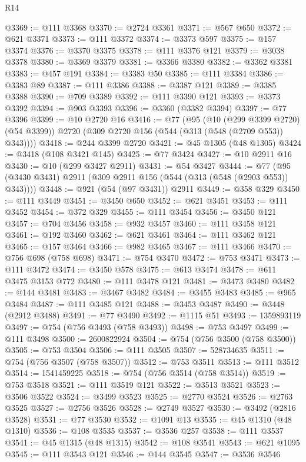 \begin{lexlean}{R14}
\begin{coremodule}
@3369 := @111 @3368
@3370 := @2724 @3361
@3371 := @567 @650
@3372 := @621 @3371
@3373 := @111 @3372
@3374 := @3373 @597
@3375 := @157 @3374
@3376 := @3370 @3375
@3378 := @111 @3376 @121
@3379 := @3038 @3378
@3380 := @3369 @3379
@3381 := @3366 @3380
@3382 := @3362 @3381
@3383 := @457 @191
@3384 := @3383 @50
@3385 := @111 @3384
@3386 := @3383 @89
@3387 := @111 @3386
@3388 := @3387 @121
@3389 := @3385 @3388
@3390 := @709 @3389
@3392 := @111 @3390 @121
@3393 := @3373 @3392
@3394 := @903 @3393
@3396 := @3360 (@3382 @3394)
@3397 := @77 @3396
@3399 := @10 @2720 @16
@3416 := @77
    (@95
      (@10 (@299 @3399 @2720) (@54 @3399))
      @2720
      (@309 @2720 @156 (@544 (@313 (@548 (@2709 @553)) @343))))
@3418 := @244 @3399 @2720
@3421 := @45 @1305 (@48 @1305)
@3424 := @3418 (@108 @3421 @145)
@3425 := @77 @3424
@3427 := @10 @2911 @16
@3430 := @10 (@299 @3427 @2911)
@3431 := @54 @3427
@3444 := @77 (@95 (@3430 @3431) @2911 (@309 @2911 @156 (@544 (@313 (@548 (@2903 @553)) @343))))
@3448 := @921 (@54 (@97 @3431)) @2911
@3449 := @358 @329
@3450 := @111 @3449
@3451 := @3450 @650
@3452 := @621 @3451
@3453 := @111 @3452
@3454 := @372 @329
@3455 := @111 @3454
@3456 := @3450 @121
@3457 := @704 @3456
@3458 := @932 @3457
@3460 := @111 @3458 @121
@3461 := @192 @3460
@3462 := @621 @3461
@3464 := @111 @3462 @121
@3465 := @157 @3464
@3466 := @982 @3465
@3467 := @111 @3466
@3470 := @756 @698 (@758 @698)
@3471 := @754 @3470
@3472 := @753 @3471
@3473 := @111 @3472
@3474 := @3450 @578
@3475 := @613 @3474
@3478 := @611 @3475 @3153 @772
@3480 := @111 @3478 @121
@3481 := @3473 @3480
@3482 := @144 @3481
@3483 := @3467 @3482
@3484 := @3455 @3483
@3485 := @965 @3484
@3487 := @111 @3485 @121
@3488 := @3453 @3487
@3490 := @3448 (@2912 @3488)
@3491 := @77 @3490
@3492 := @1115 @51
@3493 := 1359893119
@3497 := @754 (@756 @3493 (@758 @3493))
@3498 := @753 @3497
@3499 := @111 @3498
@3500 := 2600822924
@3504 := @754 (@756 @3500 (@758 @3500))
@3505 := @753 @3504
@3506 := @111 @3505
@3507 := 528734635
@3511 := @754 (@756 @3507 (@758 @3507))
@3512 := @753 @3511
@3513 := @111 @3512
@3514 := 1541459225
@3518 := @754 (@756 @3514 (@758 @3514))
@3519 := @753 @3518
@3521 := @111 @3519 @121
@3522 := @3513 @3521
@3523 := @3506 @3522
@3524 := @3499 @3523
@3525 := @2770 @3524
@3526 := @2763 @3525
@3527 := @2756 @3526
@3528 := @2749 @3527
@3530 := @3492 (@2816 @3528)
@3531 := @77 @3530
@3532 := @1091 @13
@3535 := @45 @1310 (@48 @1310)
@3536 := @108 @3535
@3537 := @3536 @257
@3538 := @111 @3537
@3541 := @45 @1315 (@48 @1315)
@3542 := @108 @3541
@3543 := @621 @1095
@3545 := @111 @3543 @121
@3546 := @144 @3545
@3547 := @3536 @3546

\end{coremodule}
\end{lexlean}
